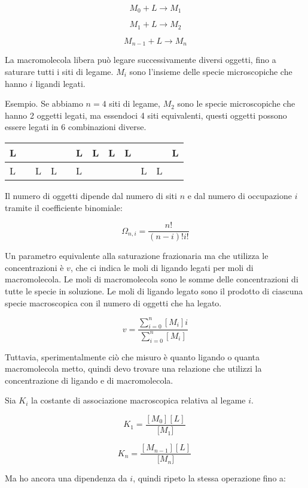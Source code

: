 \[M_{0} + L \rightarrow M_{1}\]

\[M_{1} + L \rightarrow M_{2}\]

\[M_{n - 1} + L \rightarrow M_{n}\]

La macromolecola libera può legare successivamente diversi oggetti, fino
a saturare tutti i siti di legame. \(M_{i}\) sono l'insieme delle specie
microscopiche che hanno \(i\) ligandi legati.

Esempio. Se abbiamo \(n = 4\) siti di legame, \(M_{2}\) sono le specie
microscopiche che hanno 2 oggetti legati, ma essendoci 4 siti
equivalenti, questi oggetti possono essere legati in 6 combinazioni
diverse.

\begin{longtable}[c]{@{}llllllllllll@{}}
\toprule
L & & & & & L & L & L & L & & & L\tabularnewline
\midrule
\endhead
L & & L & L & & L & & & & L & L &\tabularnewline
\bottomrule
\end{longtable}

Il numero di oggetti dipende dal numero di siti \(n\) e dal numero di
occupazione \(i\) tramite il coefficiente binomiale:

\[\Omega_{n,i} = \frac{n!}{\left( n - i \right)!i!}\]

Un parametro equivalente alla saturazione frazionaria ma che utilizza le
concentrazioni è \(v\), che ci indica le moli di ligando legati per moli
di macromolecola. Le moli di macromolecola sono le somme delle
concentrazioni di tutte le specie in soluzione. Le moli di ligando
legato sono il prodotto di ciascuna specie macroscopica con il numero di
oggetti che ha legato.

\[v = \frac{\sum_{i = 0}^{n}{\left\lbrack M_{i} \right\rbrack i}}{\sum_{i = 0}^{n}\left\lbrack M_{i} \right\rbrack}\]

Tuttavia, sperimentalmente ciò che misuro è quanto ligando o quanta
macromolecola metto, quindi devo trovare una relazione che utilizzi la
concentrazione di ligando e di macromolecola.

Sia \(K_{i}\) la costante di associazione macroscopica relativa al
legame \(i\).

\[K_{1} = \frac{\left\lbrack M_{0} \right\rbrack\left\lbrack L \right\rbrack}{\lbrack M_{1}\rbrack}\ \]

\[K_{n} = \frac{\left\lbrack M_{n - 1} \right\rbrack\left\lbrack L \right\rbrack}{\lbrack M_{n}\rbrack}\ \]

Ma ho ancora una dipendenza da \(i\), quindi ripeto la stessa operazione
fino a:

